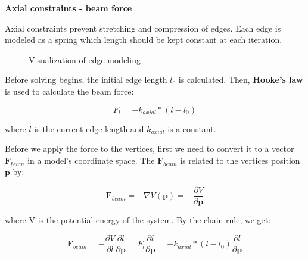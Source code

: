 \smallskip
\textbf{Axial constraints - beam force}
\smallskip

Axial constraints prevent stretching and compression of edges. 
Each edge is modeled as a spring which length should be kept constant at each iteration.

\begin{figure}[H]
	\caption{Visualization of edge modeling}
    \centering
    \qquad
\end{figure}

Before solving begins, the initial edge length $l_{0}$ is calculated.
Then, \textbf{Hooke's law} is used to calculate the beam force:

$$F_{l} = -k_{axial} * (l - l_{0})$$

where $l$ is the current edge length and $k_{axial}$ is a constant.

\smallskip
Before we apply the force to the vertices, first we need to convert it to a vector $\pmb{F}_{beam}$ in a model's coordinate space.
The $\pmb{F}_{beam}$ is related to the vertices position $\pmb{p}$ by:

$$\pmb{F}_{beam} = -\nabla V(\pmb{p}) = -\frac{\partial V}{\partial \pmb{p}}$$

where V is the potential energy of the system. By the chain rule, we get:

\begin{equation} \label{solver:beam_force}
\pmb{F}_{beam} = -\frac{\partial V}{\partial l}\frac{\partial l}{\partial \pmb{p}} = F_{l}\frac{\partial l}{\partial \pmb{p}} = -k_{axial} * (l - l_{0})\frac{\partial l}{\partial \pmb{p}}
\end{equation}


